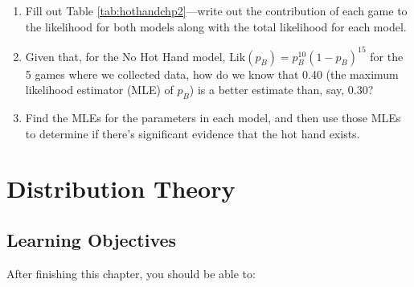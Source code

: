 \documentclass[
]{krantz}
\begin{document}
\begin{enumerate}
  \begin{enumerate}
  \def\labelenumii{\alph{enumii}.}
  \item
    Fill out Table \ref{tab:hothandchp2}---write out the contribution of each game to the likelihood for both models along with the total likelihood for each model.
  \item
    Given that, for the No Hot Hand model, \(\textrm{Lik}(p_B)=p_B^{10}(1-p_B)^{15}\) for the 5 games where we collected data, how do we know that 0.40 (the maximum likelihood estimator (MLE) of \(p_B\)) is a better estimate than, say, 0.30?
  \item
    Find the MLEs for the parameters in each model, and then use those MLEs to determine if there's significant evidence that the hot hand exists.
  \end{enumerate}
\end{enumerate}

\begin{table}
\centering
\caption{\label{tab:hothandchp2}Data for Open-ended Exercise 2.  (B = made basket.  M = missed basket.)}
\centering
{}
\end{table}

\chapter{Distribution Theory}\label{ch-distthry}

\section{Learning Objectives}\label{learning-objectives-2}

After finishing this chapter, you should be able to:
\end{document}
